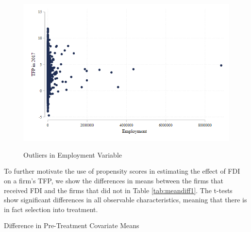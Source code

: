 \documentclass[a4paper,11pt]{scrartcl}
\begin{document}


\begin{figure}[h!]\centering
	\caption{Outliers in Employment Variable}
	\includegraphics[width=\textwidth]{emp15_outliers}
  	\label{fig:outliers}
\end{figure} 
\newpage

To further motivate the use of propensity scores in estimating the effect of FDI on a firm's TFP, we show the differences in means between the firms that received FDI and the firms that did not in Table \ref{tab:meandiff1}. The t-tests show significant differences in all observable characteristics, meaning that there is in fact selection into treatment. %


\begin{table}[h!]
	\centering
	\caption{Difference in Pre-Treatment Covariate Means}
	\makebox[\textwidth]{
	}
	\label{tab:meandiff1}
\end{table}
\end{document}
